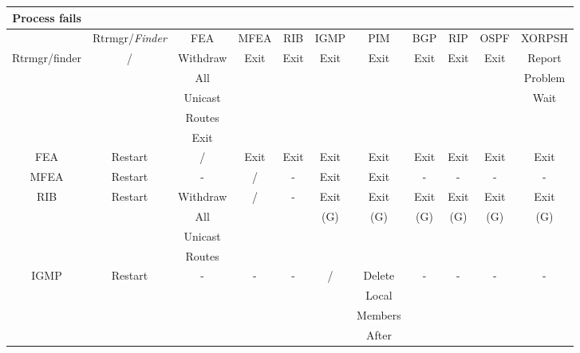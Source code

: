 \documentclass[11pt]{article}
\makeatletter
\newcommand{\finder} {{\em Finder}\@\xspace}
\makeatother
\begin{document}
\begin{table}[ht]
\begin{center}
\begin{tabular}{|c|c|c|c|c|c|c|c|c|c|c|}
\hline
Process fails &                &          &      &      &      &         &      &      &      &        \\\hline
              & Rtrmgr/\finder & FEA      & MFEA & RIB  & IGMP & PIM     & BGP  & RIP  & OSPF & XORPSH \\\hline
Rtrmgr/finder & /              & Withdraw & Exit & Exit & Exit & Exit    & Exit & Exit & Exit & Report \\
              &                & All      &      &      &      &         &      &      &      & Problem\\
              &                & Unicast  &      &      &      &         &      &      &      & Wait   \\
              &                & Routes   &      &      &      &         &      &      &      &        \\
              &                & Exit     &      &      &      &         &      &      &      &        \\\hline
FEA           &  Restart       & /        & Exit & Exit & Exit & Exit    & Exit & Exit & Exit & Exit   \\\hline
MFEA          &  Restart       & -        & /    & -    & Exit & Exit    & -    & -    & -    & -      \\\hline
RIB           &  Restart       & Withdraw & /    & -    & Exit & Exit    & Exit & Exit & Exit & Exit   \\
              &                & All      &      &      & (G)  & (G)     & (G)  & (G)  & (G)  & (G)    \\
              &                & Unicast  &      &      &      &         &      &      &      &        \\
              &                & Routes   &      &      &      &         &      &      &      &        \\\hline
IGMP          &  Restart       & -        & -    & -    & /    & Delete  & -    & -    & -    & -      \\
              &                &          &      &      &      & Local   &      &      &      &        \\
              &                &          &      &      &      & Members &      &      &      &        \\
              &                &          &      &      &      & After   &      &      &      &        \\

\end{tabular}
\end{center}
\end{table}
\end{document}
